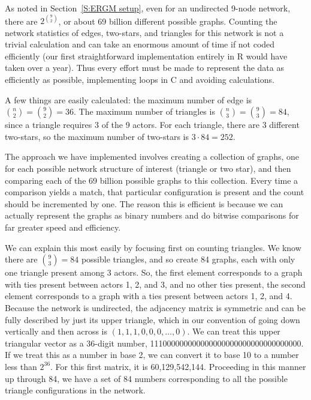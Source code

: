 \label{A:Triangle count}
As noted in Section~\ref{S:ERGM setup}, even for an undirected 9-node network, 
there are $2^{{9\choose 2}}$, or about 69 billion different possible graphs.
Counting the network statistics of edges, two-stars, and triangles for this
network is not a trivial calculation and can take an enormous amount of time 
if not coded efficiently (our first straightforward implementation 
entirely in R would have taken over a year).  Thus every effort must 
be made to represent the data as efficiently as possible, 
implementing loops in C and avoiding calculations.

A few things are easily calculated: the maximum number of edge is 
${n \choose 2} = {9 \choose 2} = 36$.  The maximum number of triangles is 
${n \choose 3} = {9 \choose 3} = 84$, since a triangle requires 3 of the 9 actors.  
For each triangle, there are 3  different two-stars, so the maximum number 
of two-stars is $3 \cdot 84 = 252$.


The approach we have implemented involves creating a collection of graphs,
one for each possible network structure of interest (triangle or two star),
and then comparing each of the 69 billion possible graphs to this collection.
Every time a comparison yields a match, that particular configuration is present
and the count should be incremented by one.  The reason this is efficient
is because we can actually represent the graphs as binary numbers and do
bitwise comparisons for far greater speed and efficiency.

We can explain this most easily by focusing first on counting triangles.
We know there are ${9 \choose 3} = 84$ possible triangles, and so create
84 graphs, each with only one triangle present among 3 actors.  
So, the first element corresponds to a graph with ties present between 
actors 1, 2, and 3, and no other ties present, the second element corresponds 
to a graph with a ties present between actors 1, 2, and 4.  
Because the network is undirected, the adjacency matrix is symmetric and 
can be fully described by just its upper triangle, which in our convention 
of going down vertically and then across is $(1,1,1,0,0,0, \ldots,0)$.  
We can treat this upper triangular vector as a 36-digit number, 
111000000000000000000000000000000000.  If we treat this as a number 
in base 2, we can convert it to base 10 to a number less than $2^{36}$.  
For this first matrix, it is 60,129,542,144.  Proceeding in this manner up 
through 84, we have a set of 84 numbers corresponding to all the possible 
triangle configurations in the network.  

